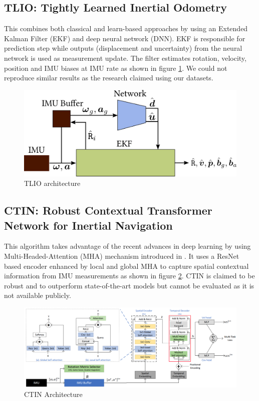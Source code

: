 \subsection{TLIO: Tightly Learned Inertial Odometry}
This combines both classical and learn-based approaches by using an Extended Kalman Filter (EKF) and deep neural network (DNN). EKF is responsible for prediction step while outputs (displacement and uncertainty) from the neural network is used as measurement update. The filter estimates rotation, velocity, position and IMU biases at IMU rate \citep{hol2009tightly} as shown in figure \ref{fig:tlio}. We could not reproduce similar results as the research claimed using our datasets.

\begin{figure}[H]
    \centering
    \includegraphics[scale=0.6]{images/fig_chapter3/tlio.png}
    \caption{TLIO architecture \citep{hol2009tightly}}
    \label{fig:tlio}
\end{figure}

\subsection{CTIN: Robust Contextual Transformer Network for Inertial Navigation}
This algorithm takes advantage of the recent advances in deep learning by using Multi-Headed-Attention (MHA) mechanism introduced in \citep{vaswani2017attention}. It uses a ResNet based encoder enhanced by local and global MHA to capture spatial contextual information from IMU measurements \citep{rao2022ctin} as shown in figure \ref{fig:ctin}. CTIN is claimed to be robust and to outperform state-of-the-art models but cannot be evaluated as it is not available publicly.

\begin{figure}[H]
    \centering
    \includegraphics[scale=0.2]{images/fig_chapter3/ctin.png}
    \caption{CTIN Architecture \citep{rao2022ctin}}
    \label{fig:ctin}
\end{figure}




